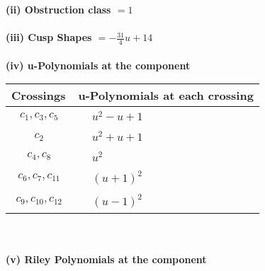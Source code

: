 \documentclass[1p]{elsarticle_modified}
\theoremstyle{definition}
\begin{document}
\flushleft \textbf{(ii) Obstruction class $= 1$}\\~\\
\flushleft \textbf{(iii) Cusp Shapes $= -\frac{31}{4} u+14$}\\~\\
\newpage\renewcommand{\arraystretch}{1}
\flushleft \textbf{(iv) u-Polynomials at the component}\newline \\
\begin{tabular}{m{50pt}|m{274pt}}
Crossings & \hspace{64pt}u-Polynomials at each crossing \\
\hline $$\begin{aligned}c_{1},c_{3},c_{5}\end{aligned}$$&$\begin{aligned}
&u^2- u+1
\end{aligned}$\\
\hline $$\begin{aligned}c_{2}\end{aligned}$$&$\begin{aligned}
&u^2+u+1
\end{aligned}$\\
\hline $$\begin{aligned}c_{4},c_{8}\end{aligned}$$&$\begin{aligned}
&u^2
\end{aligned}$\\
\hline $$\begin{aligned}c_{6},c_{7},c_{11}\end{aligned}$$&$\begin{aligned}
&(u+1)^2
\end{aligned}$\\
\hline $$\begin{aligned}c_{9},c_{10},c_{12}\end{aligned}$$&$\begin{aligned}
&(u-1)^2
\end{aligned}$\\
\hline
\end{tabular}\\~\\
\newpage\renewcommand{\arraystretch}{1}
\flushleft \textbf{(v) Riley Polynomials at the component}\newline \\
\end{document}
